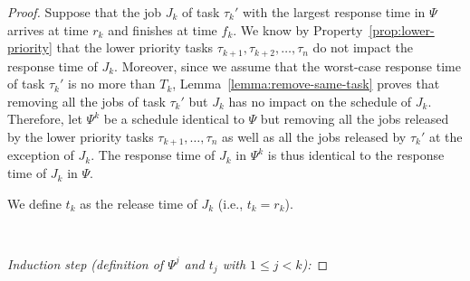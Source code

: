 \begin{proof}
Suppose that the job $J_{k}$ of task $\tau_k'$ with the largest response time in $\Psi$ arrives at time $r_k$ and finishes at time $f_k$. We know by Property~\ref{prop:lower-priority} that the lower priority tasks $\tau_{k+1}, \tau_{k+2}, \ldots, \tau_n$ do not impact the response time of $J_{k}$. Moreover, since we assume that the worst-case response time of task $\tau_k'$ is no more than $T_k$, Lemma~\ref{lemma:remove-same-task} proves that removing all the jobs of task $\tau_k'$ but $J_{k}$ has no impact on the schedule of $J_{k}$. Therefore, let $\Psi^k$ be a schedule identical to $\Psi$ but removing all the jobs released by the lower priority tasks $\tau_{k+1}, \ldots, \tau_n$ as well as all the jobs released by $\tau_k'$ at the exception of $J_{k}$. The response time of $J_{k}$ in $\Psi^{k}$ is thus identical to the response time of $J_{k}$ in $\Psi$.

We define $t_k$ as the release time of $J_k$ (i.e., $t_k = r_k$).

~

\noindent\textit{Induction step (definition of $\Psi^j$ and $t_j$ with $1 \leq j < k$):}


\end{proof}
